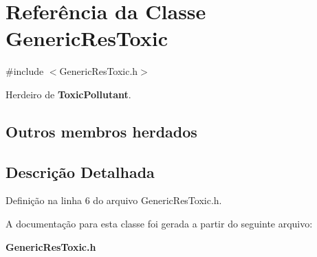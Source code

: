 \section{Referência da Classe Generic\+Res\+Toxic}
\label{class_generic_res_toxic}


{\ttfamily \#include $<$Generic\+Res\+Toxic.\+h$>$}



Herdeiro de {\bf Toxic\+Pollutant}.

\subsection*{Outros membros herdados}


\subsection{Descrição Detalhada}


Definição na linha 6 do arquivo Generic\+Res\+Toxic.\+h.



A documentação para esta classe foi gerada a partir do seguinte arquivo\+:\begin{DoxyCompactItemize}
\item 
{\bf Generic\+Res\+Toxic.\+h}\end{DoxyCompactItemize}
